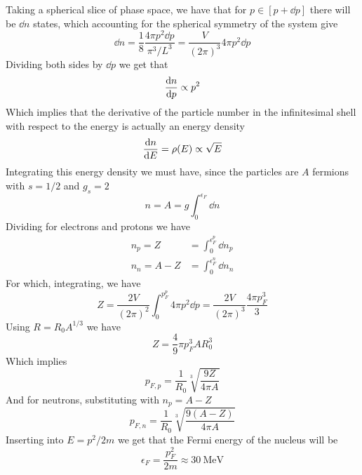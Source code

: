 \documentclass[../qm.tex]{subfiles}
\begin{document}
Taking a spherical slice of phase space, we have that for $p\in[p+\dd p]$ there will be $\dd n$ states, which accounting for the spherical symmetry of the system give
\begin{equation}
	\dd n=\frac{1}{8}\frac{4\pi p^2\dd p}{\pi^3/L^3}=\frac{V}{(2\pi)^3}4\pi p^2\dd p
	\label{eq:nstatesnucfermi}
\end{equation}
Dividing both sides by $\dd p$ we get that
\begin{equation*}
	\dv{n}{p}\propto p^2
\end{equation*}
Which implies that the derivative of the particle number in the infinitesimal shell with respect to the energy is actually an energy density
\begin{equation*}
	\dv{n}{E}=\rho(E)\propto\sqrt{E}
\end{equation*}
Integrating this energy density we must have, since the particles are $A$ fermions with $s=1/2$ and $g_s=2$
\begin{equation*}
	n=A=g\int_{0}^{\epsilon_F}\dd n
\end{equation*}
Dividing for electrons and protons we have
\begin{equation*}
	\begin{aligned}
		n_p=Z&=\int_{0}^{\epsilon_{F}^p}\dd n_p\\
		n_n=A-Z&=\int_{0}^{\epsilon_F^n}\dd n_n
	\end{aligned}
\end{equation*}
For which, integrating, we have
\begin{equation}
	Z=\frac{2V}{(2\pi)^2}\int_{0}^{p_F^p}4\pi p^2\dd p=\frac{2V}{(2\pi)^3}\frac{4\pi p^3_F}{3}
	\label{eq:integration}
\end{equation}
Using $R=R_0A^{1/3}$ we have
\begin{equation*}
	Z=\frac{4}{9}\pi p_F^3AR_0^3
\end{equation*}
Which implies
\begin{equation}
	p_{F,p}=\frac{1}{R_0}\sqrt[3]{\frac{9Z}{4\pi A}}
	\label{eq:protonfermi}
\end{equation}
And for neutrons, substituting with $n_p=A-Z$
\begin{equation}
	p_{F,n}=\frac{1}{R_0}\sqrt[3]{\frac{9(A-Z)}{4\pi A}}
	\label{eq:neutronfermi}
\end{equation}
Inserting into $E=p^2/2m$ we get that the Fermi energy of the nucleus will be
\begin{equation}
	\epsilon_F=\frac{p^2_F}{2m}\approx30\ \mathrm{MeV}
	\label{eq:nucleusfermienergy}
\end{equation}
\end{document}
